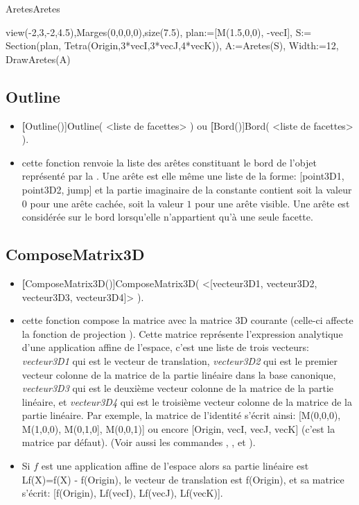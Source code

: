 \begin{demo}{Aretes}{Aretes}
\begin{texgraph}[name=Aretes]
 view(-2,3,-2,4.5),Marges(0,0,0,0),size(7.5),
 plan:=[M(1.5,0,0), -vecI],
 S:= Section(plan,
    Tetra(Origin,3*vecI,3*vecJ,4*vecK)),
 A:=Aretes(S), Width:=12, DrawAretes(A) 
\end{texgraph}
\end{demo}

\subsection{Outline}\label{cmdBord}

\begin{itemize}
 \item \util \textbf[Outline()]{Outline( <liste de facettes> )} ou \textbf[Bord()]{Bord( <liste de facettes> )}.
 \item \desc cette fonction renvoie la liste des arêtes constituant le bord de l'objet représenté par la . Une arête est elle même une liste de la forme: [point3D1, point3D2, jump] et la partie imaginaire de la constante \jump contient soit la valeur $0$ pour une arête cachée, soit la valeur $1$ pour une arête visible. Une arête est considérée sur le bord lorsqu'elle n'appartient qu'à une seule facette.
\end{itemize}

\subsection{ComposeMatrix3D}\label{cmdComposeMatrix3D}

\begin{itemize}
 \item \util \textbf[ComposeMatrix3D()]{ComposeMatrix3D( <[vecteur3D1, vecteur3D2, vecteur3D3, vecteur3D4]> )}.
 \item \desc cette fonction compose la matrice  avec la matrice 3D courante (celle-ci affecte la fonction de projection ). Cette matrice représente l'expression analytique d'une application affine de l'espace, c'est une liste de trois vecteurs: \textsl{vecteur3D1} qui est le vecteur de translation, \textsl{vecteur3D2} qui est le premier vecteur colonne de la matrice de la partie linéaire dans la base canonique, \textsl{vecteur3D3} qui est le deuxième vecteur colonne de la matrice de la partie linéaire, et \textsl{vecteur3D4} qui est le troisième vecteur colonne de la matrice de la partie linéaire. Par exemple, la matrice de l'identité s'écrit ainsi: [M(0,0,0), M(1,0,0), M(0,1,0], M(0,0,1)] ou encore [Origin, vecI, vecJ, vecK] (c'est la matrice par défaut). (Voir aussi les commandes , , et ).
 \item Si $f$ est une application affine de l'espace alors sa partie linéaire est Lf(X)=f(X) - f(Origin), le vecteur de translation est f(Origin), et sa matrice s'écrit: [f(Origin), Lf(vecI), Lf(vecJ), Lf(vecK)].
\end{itemize}


